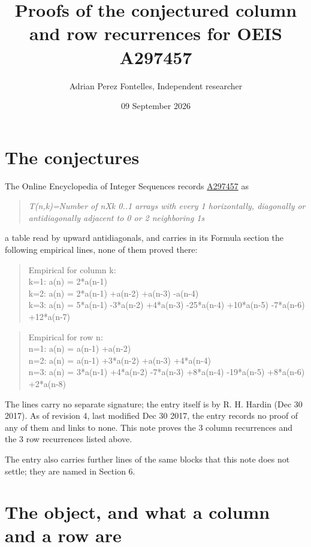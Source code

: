\documentclass[11pt]{article}
\title{Proofs of the conjectured column and row recurrences for OEIS A297457}
\author{Adrian Perez Fontelles, Independent researcher}
\date{09 September 2026}
\theoremstyle{definition}
\begin{document}
\maketitle
\section{The conjectures}

The Online Encyclopedia of Integer Sequences records \href{https://oeis.org/A297457}{A297457} as

\begin{quote}\itshape T(n,k)=Number of nXk 0..1 arrays with every 1 horizontally, diagonally or antidiagonally adjacent to 0 or 2 neighboring 1s\end{quote}

a table read by upward antidiagonals, and carries in its Formula section the following empirical lines, none of them proved there:

\begin{quote}\ttfamily Empirical for column k:\\
k=1: a(n) = 2*a(n-1)\\k=2: a(n) = 2*a(n-1) +a(n-2) +a(n-3) -a(n-4)\\k=3: a(n) = 5*a(n-1) -3*a(n-2) +4*a(n-3) -25*a(n-4) +10*a(n-5) -7*a(n-6) +12*a(n-7)\end{quote}

\begin{quote}\ttfamily Empirical for row n:\\
n=1: a(n) = a(n-1) +a(n-2)\\n=2: a(n) = a(n-1) +3*a(n-2) +a(n-3) +4*a(n-4)\\n=3: a(n) = 3*a(n-1) +4*a(n-2) -7*a(n-3) +8*a(n-4) -19*a(n-5) +8*a(n-6) +2*a(n-8)\end{quote}

The lines carry no separate signature; the entry itself is by R. H. Hardin (Dec 30 2017). As of revision 4, last modified Dec 30 2017, the entry records no proof of any of them and links to none. This note proves the 3 column recurrences and the 3 row recurrences listed above.

The entry also carries further lines of the same blocks that this note does not settle; they are named in Section 6.

\section{The object, and what a column and a row are}
\end{document}
